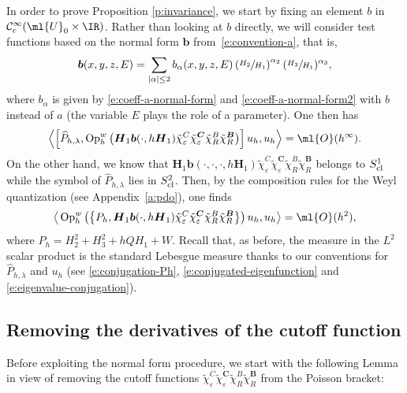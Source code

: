 \documentclass[10pt]{amsart}
\theoremstyle{plain}
\theoremstyle{definition}
\theoremstyle{remark}
\newcommand{\Op}{\operatorname{Op}}
\begin{document}
In order to prove Proposition \ref{p:invariance}, we start by fixing an element $b$ in $\mathcal{C}^\infty_c(\ml{U}_0 \times \IR)$. Rather than looking at $b$ directly, we will consider test functions based on the normal form $\boldsymbol{b}$ from~\eqref{e:convention-a}, that is,
\begin{equation}
\label{e:normal_form_for_b}
\boldsymbol{b}(x,y,z,E) = \sum_{\vert \alpha \vert \leq 2} b_\alpha(x,y,z,E) \left(\sfrac{H_2}{H_1}\right)^{\alpha_2}(\sfrac{H_3}{H_1})^{\alpha_3},
\end{equation}
where $b_\alpha$ is given by \eqref{e:coeff-a-normal-form} and \eqref{e:coeff-a-normal-form2} with $b$ instead of $a$ (the variable $E$ plays the role of a parameter).
One then has
\[
\left\langle\left[\widehat{P}_{h,\lambda}, \Op_h^w\left(\boldsymbol{H}_1 \boldsymbol{b}(\cdot,h \boldsymbol{H}_1)\tilde{\chi}_\varepsilon^C\tilde{\chi}_\varepsilon^{\boldsymbol{C}}\tilde{\chi}_R^B\tilde{\chi}_R^{\boldsymbol{B}}\right)\right] u_h,u_h\right\rangle=\ml{O}(h^\infty).
\]
On the other hand, we know that $\boldsymbol{H}_1 \boldsymbol{b}(\cdot,\cdot,\cdot,h \boldsymbol{H}_1)\tilde{\chi}_\varepsilon^C\tilde{\chi}_\varepsilon^{\boldsymbol{C}}\tilde{\chi}_R^B\tilde{\chi}_R^{\boldsymbol{B}}$ belongs to $S^1_{\textup{cl}}$ while the symbol of $\widehat{P}_{h,\lambda}$ lies in $S^2_{\textup{cl}}$. Then, by the composition rules for the Weyl quantization (see Appendix~\ref{a:pdo}), one finds
\begin{equation}
\label{e:Wignerequation}
\big \langle\Op_h^w\left(\left\{P_{h},\boldsymbol{H}_1 \boldsymbol{b}(\cdot,h \boldsymbol{H}_1)\tilde{\chi}_\varepsilon^C\tilde{\chi}_\varepsilon^{\boldsymbol{C}}\tilde{\chi}_R^B\tilde{\chi}_R^{\boldsymbol{B}}\right\}\right) u_h,u_h\big\rangle=\ml{O}(h^2),
\end{equation}
where $P_h = H_2^2+H_3^2+hQH_1+W$.
Recall that, as before, the measure in the $L^2$ scalar product is the standard Lebesgue measure thanks to our conventions for $\widehat{P}_{h,\lambda}$ and $u_h$ (see \eqref{e:conjugation-Ph}, \eqref{e:conjugated-eigenfunction} and \eqref{e:eigenvalue-conjugation}).

\subsection{Removing the derivatives of the cutoff function}

Before exploiting the normal form procedure, we start with the following Lemma in view of removing the cutoff functions $\tilde{\chi}_\varepsilon^C\tilde{\chi}_\varepsilon^{\boldsymbol{C}} \tilde{\chi}_R^B\tilde{\chi}_R^{\boldsymbol{B}}$ from the Poisson bracket:
\end{document}
